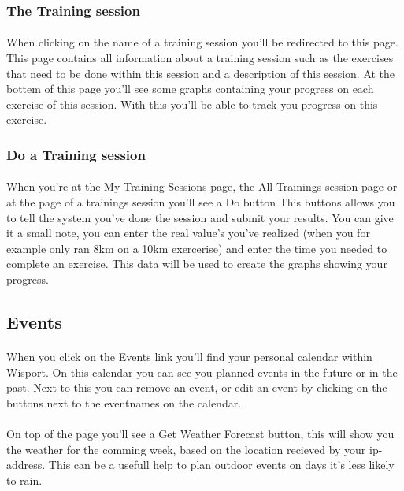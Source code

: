 \documentclass[11pt,a4paper]{scrartcl}
\begin{document}
\subsubsection{The Training session}
\paragraph{}When clicking on the name of a training session you'll be redirected to this page. This page contains all information about a training session such as the exercises that need to be done within this session and a description of this session. At the bottem of this page you'll see some graphs containing your progress on each exercise of this session. With this you'll be able to track you progress on this exercise.
\subsubsection{Do a Training session} 
\paragraph{}When you're at the My Training Sessions page, the All Trainings session page or at the page of a trainings session you'll see a Do button This buttons allows you to tell the system you've done the session and submit your results. You can give it a small note, you can enter the real value's you've realized (when you for example only ran 8km on a 10km exercerise) and enter the time you needed to complete an exercise. This data will be used to create the graphs showing your progress.

\subsection{Events} 
\paragraph{}When you click on the Events link you'll find your personal calendar within Wisport. On this calendar you can see you planned events in the future or in the past. Next to this you can remove an event, or edit an event by clicking on the buttons next to the eventnames on the calendar.
\paragraph{}On top of the page you'll see a Get Weather Forecast button, this will show you the weather for the comming week, based on the location recieved by your ip-address. This can be a usefull help to plan outdoor events on days it's less likely to rain.
\end{document}
